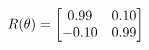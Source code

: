 \documentclass[preview]{standalone}
\begin{document}
\begin{align*}
\special{dvisvgm:raw <g id='unique000'>}R(\theta) = \begin{bmatrix}0.99 & 0.10\\-0.10 & 0.99\end{bmatrix}\special{dvisvgm:raw </g>}
\end{align*}
\end{document}
